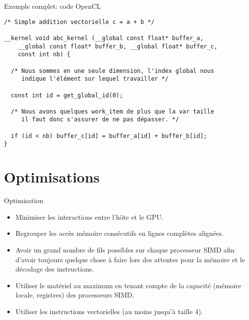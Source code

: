 \documentclass[10pt]{beamer}
\begin{document}
\begin{frame}[fragile]{Exemple complet: code OpenCL} 

  \scriptsize
  \begin{verbatim}
/* Simple addition vectorielle c = a + b */

__kernel void abc_kernel (__global const float* buffer_a,
    __global const float* buffer_b, __global float* buffer_c,
    const int nb) {

  /* Nous sommes en une seule dimension, l'index global nous
     indique l'élément sur lequel travailler */

  const int id = get_global_id(0);

  /* Nous avons quelques work_item de plus que la var taille
     il faut donc s'assurer de ne pas dépasser. */

  if (id < nb) buffer_c[id] = buffer_a[id] + buffer_b[id];
}
  \end{verbatim}
\end{frame}

\section{Optimisations}

\begin{frame}{Optimisation}

  \begin{itemize}
    \item Minimiser les interactions entre l'hôte et le GPU.

    \item Regrouper les accès mémoire consécutifs en lignes complètes alignées.

    \item Avoir un grand nombre de fils possibles sur chaque processeur SIMD afin d'avoir toujours quelque chose à faire lors des attentes pour la mémoire et le décodage des instructions.

    \item Utiliser le matériel au maximum en tenant compte de la capacité (mémoire locale, registres) des processeurs SIMD.

    \item Utiliser les instructions vectorielles (au moins jusqu'à taille 4).
  \end{itemize}
\end{frame}
\end{document}
